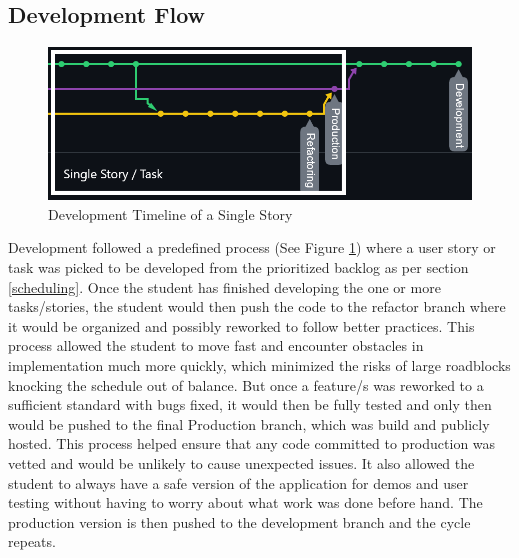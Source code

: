 \subsection{Development Flow} \label{devflow}
\begin{figure}
    \centering
    \includegraphics[width=1\columnwidth]{author-files/figures/SingleStoryPath2.png}
    \caption{Development Timeline of a Single Story}
    \label{fig:singlestory}
\end{figure}

Development followed a predefined process (See Figure \ref{fig:singlestory}) where a user story or task was picked to be developed from the prioritized backlog as per section \ref{scheduling}. Once the student has finished developing the one or more tasks/stories, the student would then push the code to the refactor branch where it would be organized and possibly reworked to follow better practices. This process allowed the student to move fast and encounter obstacles in implementation much more quickly, which minimized the risks of large roadblocks knocking the schedule out of balance. But once a feature/s was reworked to a sufficient standard with bugs fixed, it would then be fully tested and only then would be pushed to the final Production branch, which was build and publicly hosted.
This process helped ensure that any code committed to production was vetted and would be unlikely to cause unexpected issues. It also allowed the student to always have a safe version of the application for demos and user testing without having to worry about what work was done before hand.
The production version is then pushed to the development branch and the cycle repeats.


